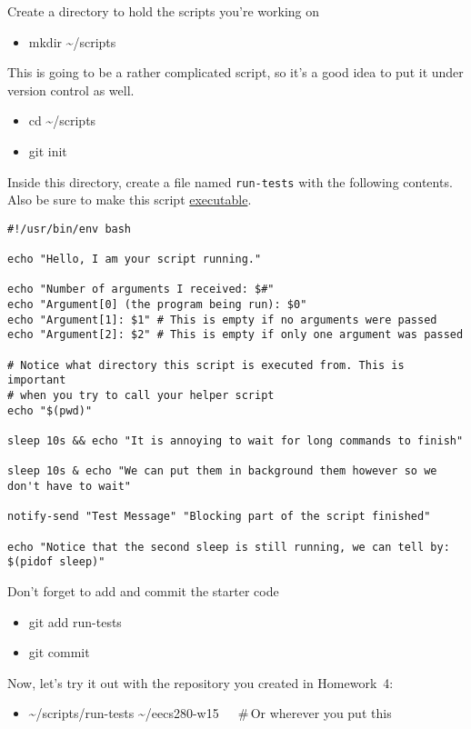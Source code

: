 \documentclass{article}
\begin{document}
\medskip
\noindent
Create a directory to hold the scripts you're working on
\begin{itemize}\tt
  \item mkdir \textasciitilde/scripts
\end{itemize}
This is going to be a rather complicated script, so it's a good
idea to put it under version control as well.
\begin{itemize}\tt
  \item cd \textasciitilde/scripts
  \item git init
\end{itemize}
Inside this directory, create a file named \texttt{run-tests} with the
following contents.  Also be sure to make this script
\href{https://piazza.com/class/ixgsfwif4f35is?cid=35}{executable}.
\begin{lstlisting}
#!/usr/bin/env bash

echo "Hello, I am your script running."

echo "Number of arguments I received: $#"
echo "Argument[0] (the program being run): $0"
echo "Argument[1]: $1" # This is empty if no arguments were passed
echo "Argument[2]: $2" # This is empty if only one argument was passed

# Notice what directory this script is executed from. This is important
# when you try to call your helper script
echo "$(pwd)"

sleep 10s && echo "It is annoying to wait for long commands to finish"

sleep 10s & echo "We can put them in background them however so we don't have to wait"

notify-send "Test Message" "Blocking part of the script finished"

echo "Notice that the second sleep is still running, we can tell by: $(pidof sleep)"
\end{lstlisting}
%
Don't forget to add and commit the starter code
\begin{itemize}\tt
  \item git add run-tests
  \item git commit
\end{itemize}
%
Now, let's try it out with the repository you created in Homework~4:
\begin{itemize}\tt
  \item \textasciitilde/scripts/run-tests \textasciitilde/eecs280-w15~~~\#\,Or wherever you put this
\end{itemize}

\medskip
\noindent
\end{document}
